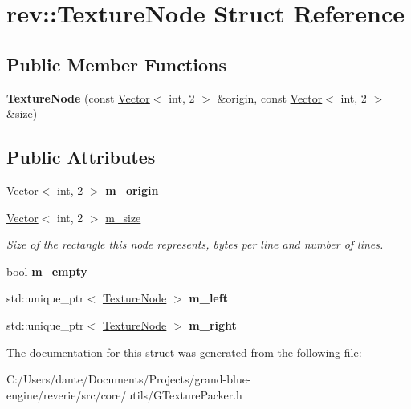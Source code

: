 \hypertarget{structrev_1_1_texture_node}{}\section{rev\+::Texture\+Node Struct Reference}
\label{structrev_1_1_texture_node}
\subsection*{Public Member Functions}
\begin{DoxyCompactItemize}
\item 
\mbox{\label{structrev_1_1_texture_node_ae9821c88e14936a092ce305422b7b707}} 
{\bfseries Texture\+Node} (const \mbox{\hyperlink{classrev_1_1_vector}{Vector}}$<$ int, 2 $>$ \&origin, const \mbox{\hyperlink{classrev_1_1_vector}{Vector}}$<$ int, 2 $>$ \&size)
\end{DoxyCompactItemize}
\subsection*{Public Attributes}
\begin{DoxyCompactItemize}
\item 
\mbox{\label{structrev_1_1_texture_node_a645be363c04184f4b316a0634ad794f0}} 
\mbox{\hyperlink{classrev_1_1_vector}{Vector}}$<$ int, 2 $>$ {\bfseries m\+\_\+origin}
\item 
\mbox{\label{structrev_1_1_texture_node_ad62be6c57a5e835c048805f23ecdf19d}} 
\mbox{\hyperlink{classrev_1_1_vector}{Vector}}$<$ int, 2 $>$ \mbox{\hyperlink{structrev_1_1_texture_node_ad62be6c57a5e835c048805f23ecdf19d}{m\+\_\+size}}
\begin{DoxyCompactList}\small\item\em Size of the rectangle this node represents, bytes per line and number of lines. \end{DoxyCompactList}\item 
\mbox{\label{structrev_1_1_texture_node_ae3c6aab523642884517fb9173c84fb60}} 
bool {\bfseries m\+\_\+empty}
\item 
\mbox{\label{structrev_1_1_texture_node_a73515737a07addc9b527ad29b4684141}} 
std\+::unique\+\_\+ptr$<$ \mbox{\hyperlink{structrev_1_1_texture_node}{Texture\+Node}} $>$ {\bfseries m\+\_\+left}
\item 
\mbox{\label{structrev_1_1_texture_node_a40633d480b337fd8346670f6f1ddf1d0}} 
std\+::unique\+\_\+ptr$<$ \mbox{\hyperlink{structrev_1_1_texture_node}{Texture\+Node}} $>$ {\bfseries m\+\_\+right}
\end{DoxyCompactItemize}


The documentation for this struct was generated from the following file\+:\begin{DoxyCompactItemize}
\item 
C\+:/\+Users/dante/\+Documents/\+Projects/grand-\/blue-\/engine/reverie/src/core/utils/G\+Texture\+Packer.\+h\end{DoxyCompactItemize}
